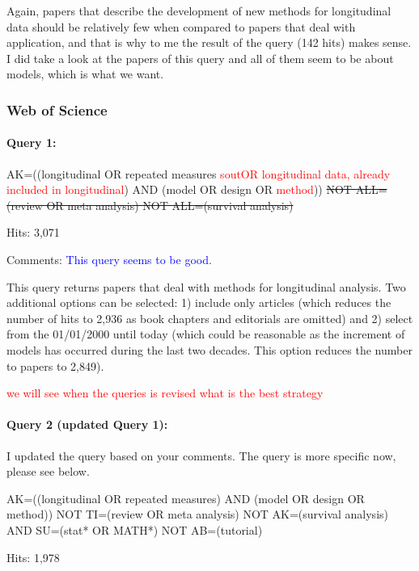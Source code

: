 \documentclass[
]{article}
\let\oldparagraph\paragraph
\renewcommand{\paragraph}[1]{\oldparagraph{#1}\mbox{}}
\newcommand{\BN}[1]{\textcolor{red}{#1}}
\begin{document}
Again, papers that describe the development of new methods for
longitudinal data should be relatively few when compared to papers that
deal with application, and that is why to me the result of the query
(142 hits) makes sense. I did take a look at the papers of this query
and all of them seem to be about models, which is what we want.

\hypertarget{web-of-science-1}{%
\subsubsection{Web of Science}\label{web-of-science-1}}

\hypertarget{query-1-2}{%
\paragraph{Query 1:}\label{query-1-2}}

AK=((longitudinal OR repeated measures
\BN{sout{OR longitudinal data, already included in longitudinal}}) AND
(model OR design OR \BN{method}))
\sout{NOT ALL=(review OR meta analysis) NOT ALL=(survival
analysis)}

Hits: 3,071

Comments: \textcolor{blue}{This query seems to be good}.

This query returns papers that deal with methods for longitudinal
analysis. Two additional options can be selected: 1) include only
articles (which reduces the number of hits to 2,936 as book chapters and
editorials are omitted) and 2) select from the 01/01/2000 until today
(which could be reasonable as the increment of models has occurred
during the last two decades. This option reduces the number to papers to
2,849).

\BN{we will see when the queries is revised what is the best strategy}

\hypertarget{query-2-updated-query-1-1}{%
\paragraph{Query 2 (updated Query 1):}\label{query-2-updated-query-1-1}}

I updated the query based on your comments. The query is more specific
now, please see below.

AK=((longitudinal OR repeated measures) AND (model OR design OR method))
NOT TI=(review OR meta analysis) NOT AK=(survival analysis) AND
SU=(stat* OR MATH*) NOT AB=(tutorial)

Hits: 1,978
\end{document}
